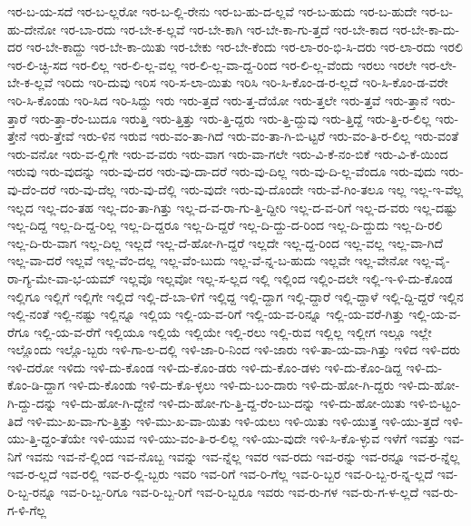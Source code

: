 {ಇರ-ಬ-ಯ-ಸದೆ
ಇರ-ಬ-ಲ್ಲರೋ
ಇರ-ಬ-ಲ್ಲಿ-ರೇನು
ಇರ-ಬ-ಹು-ದ-ಲ್ಲವೆ
ಇರ-ಬ-ಹುದು
ಇರ-ಬ-ಹುದೇ
ಇರ-ಬ-ಹು-ದೇನೋ
ಇರ-ಬಾ-ರದು
ಇರ-ಬೇ-ಕ-ಲ್ಲವೆ
ಇರ-ಬೇ-ಕಾಗಿ
ಇರ-ಬೇ-ಕಾ-ಗು-ತ್ತದೆ
ಇರ-ಬೇ-ಕಾದ
ಇರ-ಬೇ-ಕಾ-ದು-ದರ
ಇರ-ಬೇ-ಕಾದ್ದು
ಇರ-ಬೇ-ಕಾ-ಯಿತು
ಇರ-ಬೇಕು
ಇರ-ಬೇ-ಕೆಂದು
ಇರ-ಲಾ-ರಂ-ಭಿ-ಸಿ-ದರು
ಇರ-ಲಾ-ರದು
ಇರಲಿ
ಇರ-ಲಿ-ಚ್ಛಿ-ಸದ
ಇರ-ಲಿಲ್ಲ
ಇರ-ಲಿ-ಲ್ಲ-ವಲ್ಲ
ಇರ-ಲಿ-ಲ್ಲ-ವಾ-ದ್ದ-ರಿಂದ
ಇರ-ಲಿ-ಲ್ಲ-ವೆಂದು
ಇರಲು
ಇರಲೇ
ಇರ-ಲೇ-ಬೇ-ಕ-ಲ್ಲವೆ
ಇರಿದು
ಇರಿ-ದುವು
ಇರಿಸ
ಇರಿ-ಸ-ಲಾ-ಯಿತು
ಇರಿಸಿ
ಇರಿ-ಸಿ-ಕೊಂ-ಡ-ರ-ಲ್ಲದೆ
ಇರಿ-ಸಿ-ಕೊಂ-ಡ-ವರೇ
ಇರಿ-ಸಿ-ಕೊಂಡು
ಇರಿ-ಸಿದ
ಇರಿ-ಸಿದ್ದು
ಇರು
ಇರು-ತ್ತದೆ
ಇರು-ತ್ತ-ದೆಯೋ
ಇರು-ತ್ತಲೇ
ಇರು-ತ್ತವೆ
ಇರು-ತ್ತಾನೆ
ಇರು-ತ್ತಾರೆ
ಇರು-ತ್ತಾ-ರೆಂ-ಬುದೂ
ಇರುತ್ತಿ
ಇರು-ತ್ತಿತ್ತು
ಇರು-ತ್ತಿ-ದ್ದರು
ಇರು-ತ್ತಿ-ದ್ದುವು
ಇರು-ತ್ತಿದ್ದೆ
ಇರು-ತ್ತಿ-ರ-ಲಿಲ್ಲ
ಇರು-ತ್ತೇನೆ
ಇರು-ತ್ತೇವೆ
ಇರು-ಳಿನ
ಇರುವ
ಇರು-ವಂ-ತಾ-ಗಿದೆ
ಇರು-ವಂ-ತಾ-ಗಿ-ಬಿ-ಟ್ಟರೆ
ಇರು-ವಂ-ತಿ-ರ-ಲಿಲ್ಲ
ಇರು-ವಂತೆ
ಇರು-ವನೋ
ಇರು-ವ-ಲ್ಲಿಗೇ
ಇರು-ವ-ವರು
ಇರು-ವಾಗ
ಇರು-ವಾ-ಗಲೇ
ಇರು-ವಿ-ಕೆ-ನಂ-ಬಿಕೆ
ಇರು-ವಿ-ಕೆ-ಯಿಂದ
ಇರುವು
ಇರು-ವುದನ್ನು
ಇರು-ವು-ದರ
ಇರು-ವು-ದಾ-ದರೆ
ಇರು-ವು-ದಿಲ್ಲ
ಇರು-ವು-ದಿ-ಲ್ಲ-ವೆಂದೂ
ಇರು-ವುದು
ಇರು-ವು-ದೆಂ-ದರೆ
ಇರು-ವು-ದೆಲ್ಲ
ಇರು-ವು-ದೆಲ್ಲಿ
ಇರು-ವುದೇ
ಇರು-ವು-ದೊಂದೇ
ಇರು-ವೆ-ಗಿಂ-ತಲೂ
ಇಲ್ಲ
ಇಲ್ಲ-ಇ-ವೆಲ್ಲ
ಇಲ್ಲದ
ಇಲ್ಲ-ದಂ-ತಹ
ಇಲ್ಲ-ದಂ-ತಾ-ಗಿತ್ತು
ಇಲ್ಲ-ದ-ವ-ರಾ-ಗು-ತ್ತಿ-ದ್ದೀರಿ
ಇಲ್ಲ-ದ-ವ-ರಿಗೆ
ಇಲ್ಲ-ದ-ವರು
ಇಲ್ಲ-ದಷ್ಟು
ಇಲ್ಲ-ದಿದ್ದ
ಇಲ್ಲ-ದಿ-ದ್ದ-ರಿಲ್ಲ
ಇಲ್ಲ-ದಿ-ದ್ದರೂ
ಇಲ್ಲ-ದಿ-ದ್ದರೆ
ಇಲ್ಲ-ದಿ-ದ್ದು-ದ-ರಿಂದ
ಇಲ್ಲ-ದಿ-ದ್ದುದು
ಇಲ್ಲ-ದಿ-ರಲಿ
ಇಲ್ಲ-ದಿ-ರು-ವಾಗ
ಇಲ್ಲ-ದಿಲ್ಲ
ಇಲ್ಲದೆ
ಇಲ್ಲ-ದೆ-ಹೋ-ಗಿ-ದ್ದರೆ
ಇಲ್ಲದೇ
ಇಲ್ಲ-ದ್ದ-ರಿಂದ
ಇಲ್ಲ-ವಲ್ಲ
ಇಲ್ಲ-ವಾ-ಗಿದೆ
ಇಲ್ಲ-ವಾ-ದರೆ
ಇಲ್ಲವೆ
ಇಲ್ಲ-ವೆಂ-ದಲ್ಲ
ಇಲ್ಲ-ವೆಂ-ಬುದು
ಇಲ್ಲ-ವೆ-ನ್ನ-ಬ-ಹುದು
ಇಲ್ಲವೇ
ಇಲ್ಲ-ವೇನೋ
ಇಲ್ಲ-ವೈ-ರಾ-ಗ್ಯ-ಮೇ-ವಾ-ಭ-ಯಮ್
ಇಲ್ಲವೊ
ಇಲ್ಲವೋ
ಇಲ್ಲ-ಸ-ಲ್ಲದ
ಇಲ್ಲಿ
ಇಲ್ಲಿಂದ
ಇಲ್ಲಿಂ-ದಲೇ
ಇಲ್ಲಿ-ಇ-ಳಿ-ದು-ಕೊಂಡ
ಇಲ್ಲಿಗೂ
ಇಲ್ಲಿಗೆ
ಇಲ್ಲಿಗೇ
ಇಲ್ಲಿದೆ
ಇಲ್ಲಿ-ದೆ-ಬಾ-ಳಿಗೆ
ಇಲ್ಲಿದ್ದ
ಇಲ್ಲಿ-ದ್ದಾಗ
ಇಲ್ಲಿ-ದ್ದಾರೆ
ಇಲ್ಲಿ-ದ್ದಾಳೆ
ಇಲ್ಲಿ-ದ್ದಿ-ದ್ದರೆ
ಇಲ್ಲಿನ
ಇಲ್ಲಿ-ನಂತೆ
ಇಲ್ಲಿ-ನಷ್ಟು
ಇಲ್ಲಿನ್ನೂ
ಇಲ್ಲಿಯ
ಇಲ್ಲಿ-ಯ-ವ-ರಿಗೆ
ಇಲ್ಲಿ-ಯ-ವ-ರಿನ್ನೂ
ಇಲ್ಲಿ-ಯ-ವರೆ-ಗಿತ್ತು
ಇಲ್ಲಿ-ಯ-ವ-ರೆಗೂ
ಇಲ್ಲಿ-ಯ-ವ-ರೆಗೆ
ಇಲ್ಲಿಯೂ
ಇಲ್ಲಿಯೆ
ಇಲ್ಲಿಯೇ
ಇಲ್ಲಿ-ರಲು
ಇಲ್ಲಿ-ರುವ
ಇಲ್ಲಿಲ್ಲ
ಇಲ್ಲೀಗ
ಇಲ್ಲೂ
ಇಲ್ಲೇ
ಇಲ್ಲೊಂದು
ಇಲ್ಲೊ-ಬ್ಬರು
ಇಳಿ-ಗಾ-ಲ-ದಲ್ಲಿ
ಇಳಿ-ಜಾ-ರಿ-ನಿಂದ
ಇಳಿ-ಜಾರು
ಇಳಿ-ತಾ-ಯ-ವಾ-ಗಿತ್ತು
ಇಳಿದ
ಇಳಿ-ದರು
ಇಳಿ-ದರೋ
ಇಳಿದು
ಇಳಿ-ದು-ಕೊಂಡ
ಇಳಿ-ದು-ಕೊಂ-ಡರು
ಇಳಿ-ದು-ಕೊಂ-ಡಳು
ಇಳಿ-ದು-ಕೊಂ-ಡಿದ್ದ
ಇಳಿ-ದು-ಕೊಂ-ಡಿ-ದ್ದಾಗ
ಇಳಿ-ದು-ಕೊಂಡು
ಇಳಿ-ದು-ಕೊ-ಳ್ಳಲು
ಇಳಿ-ದು-ಬಂ-ದಾರು
ಇಳಿ-ದು-ಹೋ-ಗಿ-ದ್ದರು
ಇಳಿ-ದು-ಹೋ-ಗಿ-ದ್ದು-ದನ್ನು
ಇಳಿ-ದು-ಹೋ-ಗಿ-ದ್ದೇನೆ
ಇಳಿ-ದು-ಹೋ-ಗು-ತ್ತಿ-ದ್ದ-ರೆಂ-ಬು-ದನ್ನು
ಇಳಿ-ದು-ಹೋ-ಯಿತು
ಇಳಿ-ಬಿ-ಟ್ಟಂ-ತಿದೆ
ಇಳಿ-ಮು-ಖ-ವಾ-ಗು-ತ್ತಿತ್ತು
ಇಳಿ-ಮು-ಖ-ವಾ-ಯಿತು
ಇಳಿ-ಯಲು
ಇಳಿ-ಯಿತು
ಇಳಿ-ಯುತ್ತ
ಇಳಿ-ಯು-ತ್ತದೆ
ಇಳಿ-ಯು-ತ್ತಿ-ದ್ದಂ-ತೆಯೇ
ಇಳಿ-ಯುವ
ಇಳಿ-ಯು-ವಂ-ತಿ-ರ-ಲಿಲ್ಲ
ಇಳಿ-ಯು-ವುದೇ
ಇಳಿ-ಸಿ-ಕೊ-ಳ್ಳುವ
ಇಳೆಗೆ
ಇವತ್ತು
ಇವ-ನಿಗೆ
ಇವನು
ಇವ-ನೆ-ಲ್ಲಿಂದ
ಇವ-ನೊಬ್ಬ
ಇವನ್ನು
ಇವ-ನ್ನೆಲ್ಲ
ಇವರ
ಇವ-ರದು
ಇವ-ರನ್ನು
ಇವ-ರನ್ನೂ
ಇವ-ರ-ನ್ನೆಲ್ಲ
ಇವ-ರ-ಲ್ಲದೆ
ಇವ-ರಲ್ಲಿ
ಇವ-ರ-ಲ್ಲಿ-ಬ್ಬರು
ಇವರಿ
ಇವ-ರಿಗೆ
ಇವ-ರಿ-ಗೆಲ್ಲ
ಇವ-ರಿ-ಬ್ಬರ
ಇವ-ರಿ-ಬ್ಬ-ರ-ನ್ನ-ಲ್ಲದೆ
ಇವ-ರಿ-ಬ್ಬ-ರನ್ನೂ
ಇವ-ರಿ-ಬ್ಬ-ರಿಗೂ
ಇವ-ರಿ-ಬ್ಬ-ರಿಗೆ
ಇವ-ರಿ-ಬ್ಬರೂ
ಇವರು
ಇವ-ರು-ಗಳ
ಇವ-ರು-ಗ-ಳ-ಲ್ಲದೆ
ಇವ-ರು-ಗ-ಳಿ-ಗೆಲ್ಲ
}
